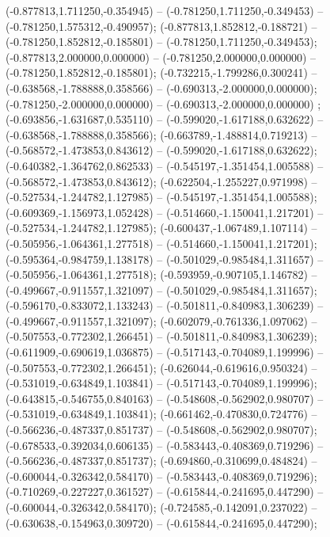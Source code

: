 (-0.877813,1.711250,-0.354945) -- (-0.781250,1.711250,-0.349453) -- (-0.781250,1.575312,-0.490957);
 (-0.877813,1.852812,-0.188721) -- (-0.781250,1.852812,-0.185801) -- (-0.781250,1.711250,-0.349453);
 (-0.877813,2.000000,0.000000) -- (-0.781250,2.000000,0.000000) -- (-0.781250,1.852812,-0.185801);
 (-0.732215,-1.799286,0.300241) -- (-0.638568,-1.788888,0.358566) -- (-0.690313,-2.000000,0.000000);
 (-0.781250,-2.000000,0.000000) -- (-0.690313,-2.000000,0.000000) ;
 (-0.693856,-1.631687,0.535110) -- (-0.599020,-1.617188,0.632622) -- (-0.638568,-1.788888,0.358566);
 (-0.663789,-1.488814,0.719213) -- (-0.568572,-1.473853,0.843612) -- (-0.599020,-1.617188,0.632622);
 (-0.640382,-1.364762,0.862533) -- (-0.545197,-1.351454,1.005588) -- (-0.568572,-1.473853,0.843612);
 (-0.622504,-1.255227,0.971998) -- (-0.527534,-1.244782,1.127985) -- (-0.545197,-1.351454,1.005588);
 (-0.609369,-1.156973,1.052428) -- (-0.514660,-1.150041,1.217201) -- (-0.527534,-1.244782,1.127985);
 (-0.600437,-1.067489,1.107114) -- (-0.505956,-1.064361,1.277518) -- (-0.514660,-1.150041,1.217201);
 (-0.595364,-0.984759,1.138178) -- (-0.501029,-0.985484,1.311657) -- (-0.505956,-1.064361,1.277518);
 (-0.593959,-0.907105,1.146782) -- (-0.499667,-0.911557,1.321097) -- (-0.501029,-0.985484,1.311657);
 (-0.596170,-0.833072,1.133243) -- (-0.501811,-0.840983,1.306239) -- (-0.499667,-0.911557,1.321097);
 (-0.602079,-0.761336,1.097062) -- (-0.507553,-0.772302,1.266451) -- (-0.501811,-0.840983,1.306239);
 (-0.611909,-0.690619,1.036875) -- (-0.517143,-0.704089,1.199996) -- (-0.507553,-0.772302,1.266451);
 (-0.626044,-0.619616,0.950324) -- (-0.531019,-0.634849,1.103841) -- (-0.517143,-0.704089,1.199996);
 (-0.643815,-0.546755,0.840163) -- (-0.548608,-0.562902,0.980707) -- (-0.531019,-0.634849,1.103841);
 (-0.661462,-0.470830,0.724776) -- (-0.566236,-0.487337,0.851737) -- (-0.548608,-0.562902,0.980707);
 (-0.678533,-0.392034,0.606135) -- (-0.583443,-0.408369,0.719296) -- (-0.566236,-0.487337,0.851737);
 (-0.694860,-0.310699,0.484824) -- (-0.600044,-0.326342,0.584170) -- (-0.583443,-0.408369,0.719296);
 (-0.710269,-0.227227,0.361527) -- (-0.615844,-0.241695,0.447290) -- (-0.600044,-0.326342,0.584170);
 (-0.724585,-0.142091,0.237022) -- (-0.630638,-0.154963,0.309720) -- (-0.615844,-0.241695,0.447290);
